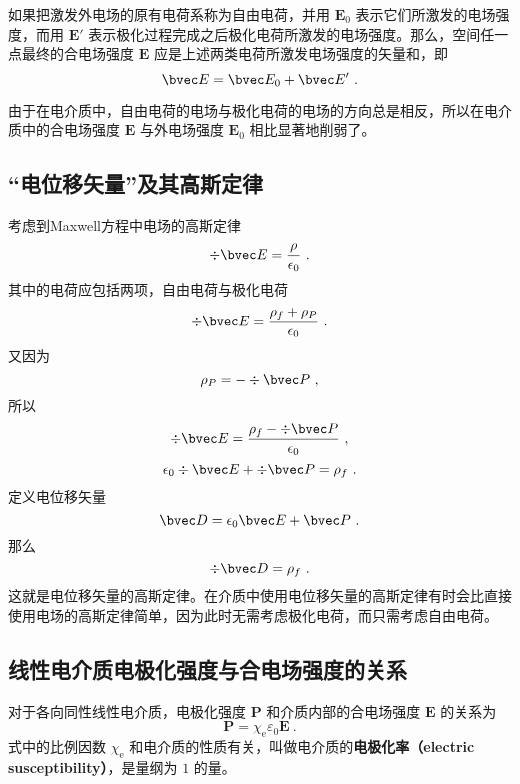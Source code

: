 

如果把激发外电场的原有电荷系称为自由电荷，并用 $\mathbf E_0$ 表示它们所激发的电场强度，而用 $\mathbf E'$ 表示极化过程完成之后极化电荷所激发的电场强度。那么，空间任一点最终的合电场强度 $\mathbf E $ 应是上述两类电荷所激发电场强度的矢量和，即
\begin{equation}
\bvec E = \bvec E_{0} + \bvec E'~.
\end{equation}

由于在电介质中，自由电荷的电场与极化电荷的电场的方向总是相反，所以在电介质中的合电场强度 $\mathbf E $ 与外电场强度 $\mathbf E_0$ 相比显著地削弱了。

\subsection{“电位移矢量”及其高斯定律}
考虑到Maxwell方程中电场的高斯定律
$$\div \bvec E = \frac{\rho}{\epsilon_0}~.$$
其中的电荷应包括两项，自由电荷与极化电荷
$$\div \bvec E = \frac{\rho_f+\rho_P}{\epsilon_0}~.$$
又因为
$$\rho_P=-\div \bvec P~,$$
所以
$$\div \bvec E = \frac{\rho_f-\div \bvec P}{\epsilon_0}~,$$
$$\epsilon_0 \div \bvec E + \div \bvec P= \rho_f~.$$
定义电位移矢量 
\begin{equation}
\bvec D = \epsilon_0 \bvec E + \bvec P~.
\end{equation}
那么
\begin{equation}
\div \bvec D = \rho_f~.
\end{equation}
这就是电位移矢量的高斯定律。在介质中使用电位移矢量的高斯定律有时会比直接使用电场的高斯定律简单，因为此时无需考虑极化电荷，而只需考虑自由电荷。

\subsection{线性电介质电极化强度与合电场强度的关系}
对于各向同性线性电介质，电极化强度 $\mathbf P $ 和介质内部的合电场强度 $\mathbf E $ 的关系为%
\begin{equation} 
\mathbf P=\chi_{\mathrm e} \varepsilon_{0} \mathbf E~.
\end{equation}
式中的比例因数 $\chi_{\mathrm{e}}$ 和电介质的性质有关，叫做电介质的\textbf{电极化率（electric susceptibility）}，是量纲为 $1 $ 的量。

